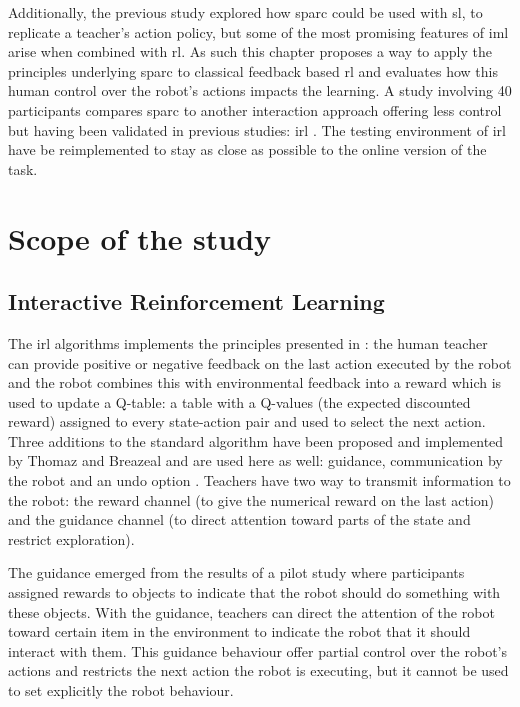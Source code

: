 Additionally, the previous study explored how \gls{sparc} could be used with \acrlong{sl}, to replicate a teacher's action policy, but some of the most promising features of \gls{iml} arise when combined with \acrfull{rl}. As such this chapter proposes a way to apply the principles underlying \gls{sparc} to classical feedback based \gls{rl} and evaluates how this human control over the robot's actions impacts the learning. A study involving 40 participants compares \gls{sparc} to another interaction approach offering less control but having been validated in previous studies: \acrfull{irl} \citep{thomaz2008teachable}. The testing environment of \gls{irl} have be reimplemented to stay as close as possible to the online version of the task.

\section{Scope of the study}

\subsection{Interactive Reinforcement Learning}

The \gls{irl} algorithms implements the principles presented in \cite{thomaz2008teachable}: the human teacher can provide positive or negative feedback on the last action executed by the robot and the robot combines this with environmental feedback into a reward which is used to update a Q-table: a table with a Q-values (the expected discounted reward) assigned to every state-action pair and used to select the next action. Three additions to the standard algorithm have been proposed and implemented by Thomaz and Breazeal and are used here as well: guidance, communication by the robot and an undo option \citep{thomaz2008teachable}. Teachers have two way to transmit information to the robot: the reward channel (to give the numerical reward on the last action) and the guidance channel (to direct attention toward parts of the state and restrict exploration).

The guidance emerged from the results of a pilot study where participants assigned rewards to objects to indicate that the robot should do something with these objects. With the guidance, teachers can direct the attention of the robot toward certain item in the environment to indicate the robot that it should interact with them. This guidance behaviour offer partial control over the robot's actions and restricts the next action the robot is executing, but it cannot be used to set explicitly the robot behaviour. 

